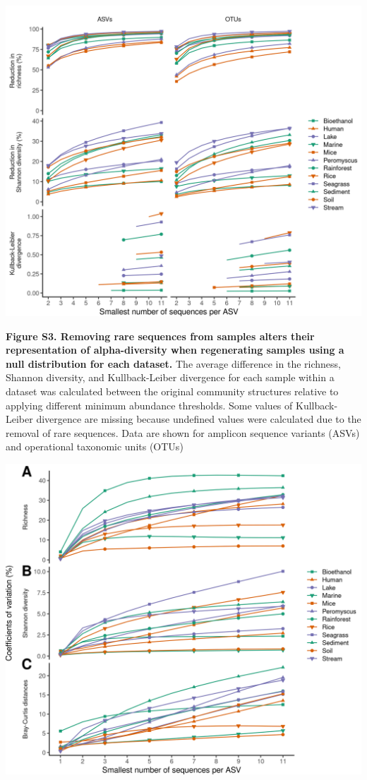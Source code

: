 \documentclass[
]{article}
\begin{document}
\newpage

\includegraphics{figure_s3.png}

\textbf{Figure S3. Removing rare sequences from samples alters their
representation of alpha-diversity when regenerating samples using a null
distribution for each dataset.} The average difference in the richness,
Shannon diversity, and Kullback-Leiber divergence for each sample within
a dataset was calculated between the original community structures
relative to applying different minimum abundance thresholds. Some values
of Kullback-Leiber divergence are missing because undefined values were
calculated due to the removal of rare sequences. Data are shown for
amplicon sequence variants (ASVs) and operational taxonomic units (OTUs)

\newpage

\includegraphics{figure_s4.png}
\end{document}
